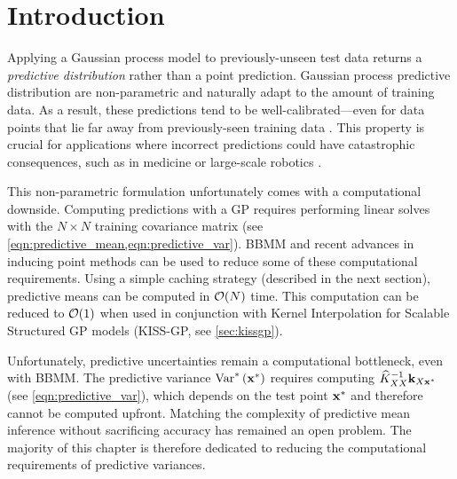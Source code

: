 \section{Introduction}
Applying a Gaussian process model to previously-unseen test data returns a \emph{predictive distribution} rather than a point prediction.
Gaussian process predictive distribution are non-parametric and naturally adapt to the amount of training data.
As a result, these predictions tend to be well-calibrated---even for data points that lie far away from previously-seen training data \cite{rasmussen2006gaussian,wilson2014thesis}.
This property is crucial for applications where incorrect predictions could have catastrophic consequences, such as in medicine \cite{schulam2017if} or large-scale robotics \cite{deisenroth2015gaussian}.

This non-parametric formulation unfortunately comes with a computational downside.
Computing predictions with a GP requires performing linear solves with the $N \times N$ training covariance matrix (see \cref{eqn:predictive_mean,eqn:predictive_var}).
BBMM and recent advances in {inducing point methods} can be used to reduce some of these computational requirements.
Using a simple caching strategy (described in the next section), predictive means can be computed in $\bigo{N}$ time.
This computation can be reduced to $\bigo{1}$ when used in conjunction with Kernel Interpolation for Scalable Structured GP models (KISS-GP, see \cref{sec:kissgp}).

Unfortunately, predictive uncertainties remain a computational bottleneck, even with BBMM.
The predictive variance $\text{Var}^* \left( \mathbf{x}^* \right)$ requires computing $\widehat{K}_{XX}^{-1} \mathbf{k}_{X\mathbf{x}^*}$ (see \cref{eqn:predictive_var}), which depends on the test point $\mathbf{x}^*$ and therefore cannot be computed upfront.
Matching the complexity of predictive mean inference without sacrificing accuracy has remained an open problem.
The majority of this chapter is therefore dedicated to reducing the computational requirements of predictive variances.

